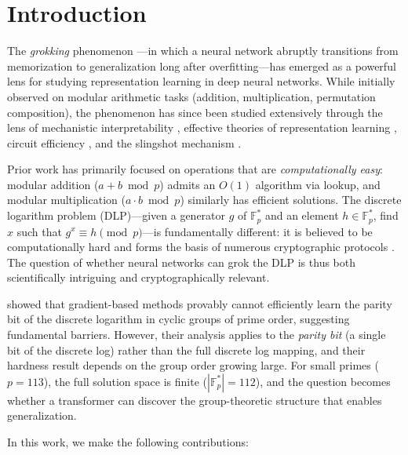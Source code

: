 \documentclass[11pt]{article}
\newcommand{\Fps}{\mathbb{F}_p^*}
\begin{document}
\section{Introduction}
\label{sec:intro}

The \emph{grokking} phenomenon \citep{power2022grokking}---in which a neural network abruptly transitions from memorization to generalization long after overfitting---has emerged as a powerful lens for studying representation learning in deep neural networks. While initially observed on modular arithmetic tasks (addition, multiplication, permutation composition), the phenomenon has since been studied extensively through the lens of mechanistic interpretability \citep{nanda2023progress}, effective theories of representation learning \citep{liu2022understanding}, circuit efficiency \citep{varma2023explaining}, and the slingshot mechanism \citep{thilak2022slingshot}.

Prior work has primarily focused on operations that are \emph{computationally easy}: modular addition ($a + b \bmod p$) admits an $O(1)$ algorithm via lookup, and modular multiplication ($a \cdot b \bmod p$) similarly has efficient solutions. The discrete logarithm problem (DLP)---given a generator $g$ of $\Fps$ and an element $h \in \Fps$, find $x$ such that $g^x \equiv h \pmod{p}$---is fundamentally different: it is believed to be computationally hard and forms the basis of numerous cryptographic protocols \citep{diffie1976new}. The question of whether neural networks can grok the DLP is thus both scientifically intriguing and cryptographically relevant.

\citet{takhanov2024intractability} showed that gradient-based methods provably cannot efficiently learn the parity bit of the discrete logarithm in cyclic groups of prime order, suggesting fundamental barriers. However, their analysis applies to the \emph{parity bit} (a single bit of the discrete log) rather than the full discrete log mapping, and their hardness result depends on the group order growing large. For small primes ($p = 113$), the full solution space is finite ($|\Fps| = 112$), and the question becomes whether a transformer can discover the group-theoretic structure that enables generalization.

In this work, we make the following contributions:
\end{document}
